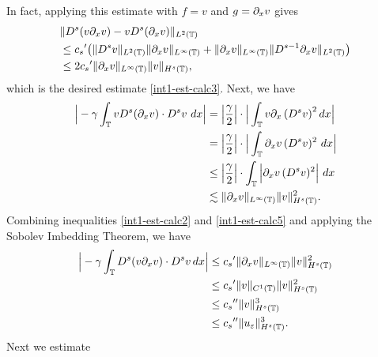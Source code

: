 	In fact, applying  this estimate with $f=v$ and $g=\partial_xv$ gives 
	\begin{equation} 
		\label{int1-est-calc4}
		\begin{split}
			& \| D^s(v\partial_x v)  -  v D^s (\partial_xv) \|_{L^2(\mathbb{T})}
			\\
			& \le
			{c_s}^\prime \big(
			\| D^{s}v \|_{L^2(\mathbb{T})}    \| \partial_x v \|_{L^\infty(\mathbb{T})} 
			+
			\| \partial_xv \|_{L^\infty(\mathbb{T})}    \| D^{s-1}\partial_x v \|_{L^2(\mathbb{T})}   
			\big)
			\\
			& \le
			2{c_s}^\prime    \| \partial_x v \|_{L^\infty(\mathbb{T})} 
			\| v \|_{H^s(\mathbb{T})}, 
		\end{split}
	\end{equation}
	which  is the desired estimate  \eqref{int1-est-calc3}.
	Next, we have
	\begin{equation} 
		\label{int1-est-calc5}
		\begin{split}
			\Big|
			-\gamma \int_{\mathbb{T}}
			v D^s (\partial_x v)
			\cdot  D^s v \ dx
			\Big|
			& =
			\left | \frac{\gamma}{2} \right | \cdot \Big|
			\int_{\mathbb{T}}
			v \partial_x\left(D^s v\right)^2  dx
			\Big|
			\\
			& =
			\left | \frac{\gamma}{2} \right | \cdot \Big | \int_{\mathbb{T}}
			\partial_x v \, (D^s v)^2 \ dx
			\Big|
			\\
			& \le
			\left | \frac{\gamma}{2} \right |  \cdot \int_{\mathbb{T}}
			\Big | \partial_x v \, (D^s v)^2   
			\Big| \ dx
			\\
			& \lesssim
			\| \partial_x v \|_{L^\infty(\mathbb{T})} 
			\| v \|_{H^s(\mathbb{T})}^2.
		\end{split}
	\end{equation}
	Combining inequalities  \eqref{int1-est-calc2} and
	\eqref{int1-est-calc5} and applying the Sobolev Imbedding Theorem, we
	have
	\begin{equation} 
		\label{burgers_est'}
		\begin{split}
			\Big|
			-\gamma \int_{\mathbb{T}}
			D^s(v \partial_x v) \cdot   D^s v \, dx  
			\Big|
			&\le
			{c_s}^\prime
			\| \partial_x v \|_{L^\infty(\mathbb{T})} 
			\|  v \|_{H^s(\mathbb{T})}^2
			\\
			& \le {c_s}^\prime \| v \|_{C^1(\mathbb{T})} \| v \|_{H^s(\mathbb{T})}^2
			\\
			& \le {c_s}^{\prime \prime} \| v \|_{H^s(\mathbb{T})}^3
			\\
			& \le {c_s}^{\prime \prime} \| u_\varepsilon \|_{H^s(\mathbb{T})}^3.
		\end{split}
	\end{equation}
	Next we estimate
